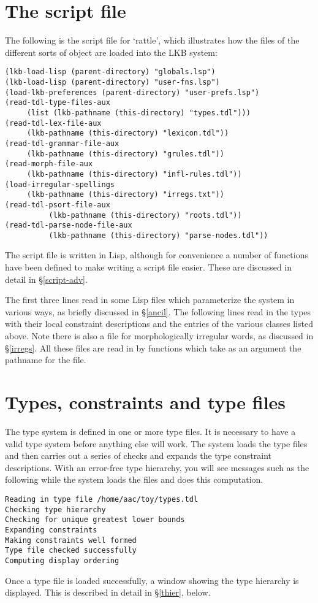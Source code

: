 \documentclass[12pt]{report}
\begin{document}
\section{The script file}
\label{script-intro}

The following is the script file for `rattle', which illustrates
how the files of the different sorts of object are loaded into the 
LKB system:
\begin{verbatim}
(lkb-load-lisp (parent-directory) "globals.lsp")
(lkb-load-lisp (parent-directory) "user-fns.lsp")
(load-lkb-preferences (parent-directory) "user-prefs.lsp")
(read-tdl-type-files-aux
     (list (lkb-pathname (this-directory) "types.tdl")))
(read-tdl-lex-file-aux 
     (lkb-pathname (this-directory) "lexicon.tdl"))
(read-tdl-grammar-file-aux 
     (lkb-pathname (this-directory) "grules.tdl"))
(read-morph-file-aux 
     (lkb-pathname (this-directory) "infl-rules.tdl"))
(load-irregular-spellings 
     (lkb-pathname (this-directory) "irregs.txt"))
(read-tdl-psort-file-aux 
          (lkb-pathname (this-directory) "roots.tdl"))
(read-tdl-parse-node-file-aux 
          (lkb-pathname (this-directory) "parse-nodes.tdl"))
\end{verbatim}
The script file is written in Lisp, although for convenience
a number of functions have been defined to make writing a script file
easier.  These are discussed in detail in \S\ref{script-adv}.

The first three lines read in some Lisp files which parameterize the
system in various ways, as briefly discussed in \S\ref{ancil}.
The following lines read in the types with their local
constraint descriptions
and the entries of the various
classes listed above.  Note there is also a file for morphologically
irregular words, as discussed in \S\ref{irregs}.  All these files are read
in by functions which take as an argument the pathname for the file.


\section{Types, constraints and type files}

The type system is defined in one or more type files.  It is necessary
to have a valid type system before anything else will work.
The system loads the type files and then carries out a series of
checks and expands the type constraint descriptions.
With an error-free type hierarchy, you will see messages such as the
following while the system loads the files and
does this computation.
\begin{verbatim}
Reading in type file /home/aac/toy/types.tdl
Checking type hierarchy
Checking for unique greatest lower bounds
Expanding constraints
Making constraints well formed
Type file checked successfully
Computing display ordering
\end{verbatim}
Once a type file is loaded successfully, a window showing the type
hierarchy is displayed. 
This is described in detail in \S\ref{thier}, below.
\end{document}
